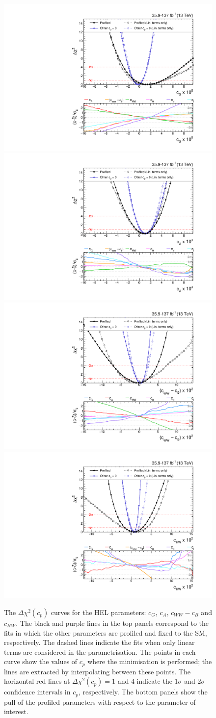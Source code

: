 \begin{figure}[htb!]
  \centering
  \includegraphics[width=.49\textwidth]{Figures/eft/chi2/observed/cG.pdf}
  \includegraphics[width=.49\textwidth]{Figures/eft/chi2/observed/cA.pdf}
  \includegraphics[width=.49\textwidth]{Figures/eft/chi2/observed/cWWMinuscB.pdf}
  \includegraphics[width=.49\textwidth]{Figures/eft/chi2/observed/cHW.pdf}
  \caption[Simplified HEL re-interpretation: $c_G$, $c_A$, $c_{WW}-c_B$ and $c_{HW}$]
  {
    The $\Delta\chi^2(c_p)$ curves for the HEL parameters: $c_G$, $c_A$, $c_{WW}-c_B$ and $c_{HW}$. The black and purple lines in the top panels correspond to the fits in which the other parameters are profiled and fixed to the SM, respectively. The dashed lines indicate the fits when only linear terms are considered in the parametrisation. The points in each curve show the values of $c_p$ where the minimisation is performed; the lines are extracted by interpolating between these points. The horizontal red lines at $\Delta\chi^2(c_p)=1$ and 4 indicate the $1\sigma$ and $2\sigma$ confidence intervals in $c_p$, respectively. The bottom panels show the pull of the profiled parameters with respect to the parameter of interest. 
  }
  \label{fig:hel_chi2_simplified_0}
\end{figure}

